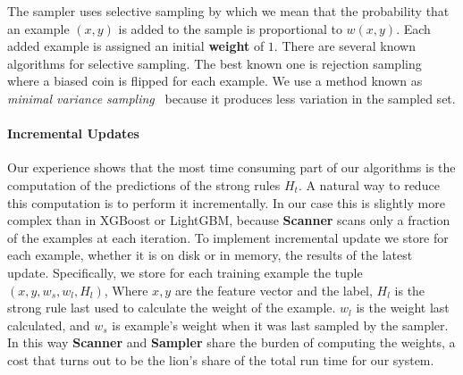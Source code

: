 The sampler uses selective sampling by which we mean that the
probability that an example $(x,y)$ is added to the sample is
proportional to $w(x,y)$. Each added example is assigned an initial
{\bf weight} of $1$.
{There are several known algorithms
  for selective sampling. The best known one is rejection sampling
  where a biased coin is flipped for each example. We use a method
  known as \textit{minimal variance sampling}~\cite{kitagawa_monte_1996}
  because it produces less variation in the sampled set.}
  
\paragraph*{Incremental Updates} Our experience shows that the most
time consuming part of our algorithms is the computation of the
predictions of the strong rules $H_t$. A natural way to reduce this
computation is to perform it incrementally. In our case this is
slightly more complex than in XGBoost or LightGBM, because {\bf
  Scanner} scans only a  fraction of the examples at each
iteration. To implement incremental update we store for each example,
whether it is on disk or in memory, the results of the latest
update. Specifically, we store for each training example the tuple
$(x, y, w_s, w_l,H_l)$, Where $x,y$ are the feature vector and the
label, $H_l$ is the strong rule last used to calculate the weight of
the example. $w_l$ is the weight last calculated, and $w_s$ is
example's weight when it was last sampled by the sampler. In this way
{\bf Scanner} and {\bf Sampler} share the burden of computing
the weights, a cost that turns out to be the lion's share of the total
run time for our system.






